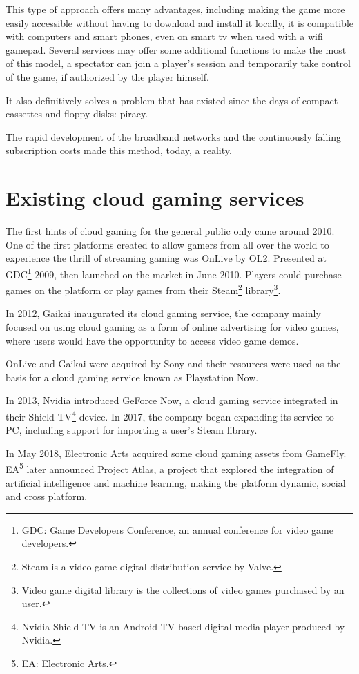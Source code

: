 This type of approach offers many advantages, including making the game more easily accessible without having to download and install it locally, it is compatible with computers and smart phones, even on smart tv when used with a wifi gamepad. Several services may offer some additional functions to make the most of this model, a spectator can join a player's session and temporarily take control of the game, if authorized by the player himself.

It also definitively solves a problem that has existed since the days of compact cassettes and floppy disks: piracy.

The rapid development of the broadband networks and the continuously falling subscription costs made this method, today, a reality.

\section{Existing cloud gaming services}
The first hints of cloud gaming for the general public only came around 2010. One of the first platforms created to allow gamers from all over the world to experience the thrill of streaming gaming was OnLive by OL2. Presented at GDC\footnote{GDC: Game Developers Conference, an annual conference for video game developers.} 2009, then launched on the market in June 2010. Players could purchase games on the platform or play games from their Steam\footnote{Steam is a video game digital distribution service by Valve.} library\footnote{Video game digital library is the collections of video games purchased by an user.}.

In 2012, Gaikai inaugurated its cloud gaming service, the company mainly focused on using cloud gaming as a form of online advertising for video games, where users would have the opportunity to access video game demos.

OnLive and Gaikai were acquired by Sony and their resources were used as the basis for a cloud gaming service known as Playstation Now.

In 2013, Nvidia introduced GeForce Now, a cloud gaming service integrated in their Shield TV\footnote{Nvidia Shield TV is an Android TV-based digital media player produced by Nvidia.} device. In 2017, the company began expanding its service to PC, including support for importing a user's Steam library.

In May 2018, Electronic Arts acquired some cloud gaming assets from GameFly. EA\footnote{EA: Electronic Arts.} later announced Project Atlas, a project that explored the integration of artificial intelligence and machine learning, making the platform dynamic, social and cross platform.

